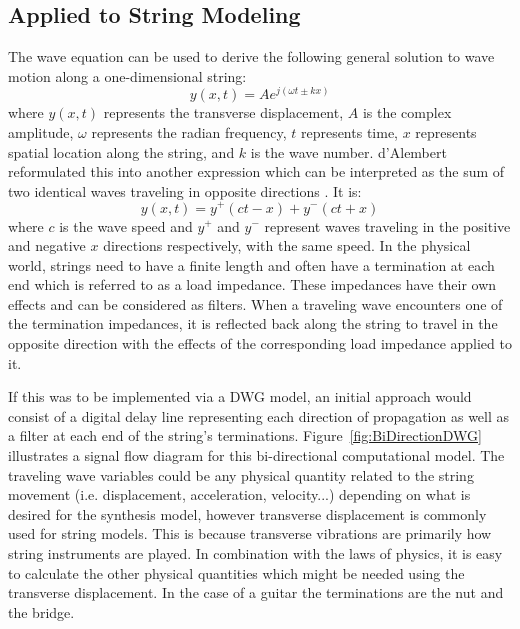 \documentclass[main.tex]{subfiles}
\begin{document}
\subsection{Applied to String Modeling}
The wave equation can be used to derive the following general solution to wave motion along a one-dimensional string:
\begin{equation}
    y(x,t) = Ae^{j\left(\omega t \pm k x\right)}
\end{equation}
where $y(x,t)$ represents the transverse displacement, $A$ is the complex amplitude, $\omega$ represents the radian frequency, $t$ represents time, $x$ represents spatial location along the string, and $k$ is the wave number. d'Alembert reformulated this into another expression which can be interpreted as the sum of two identical waves traveling in opposite directions . It is:
\begin{equation}
    y(x,t) = y^{+}(ct - x) + y^{-}(ct + x)
\end{equation}
where $c$ is the wave speed and $y^+$ and $y^-$ represent waves traveling in the positive and negative $x$ directions respectively, with the same speed. In the physical world, strings need to have a finite length and often have a termination at each end which is referred to as a load impedance. These impedances have their own effects and can be considered as filters. When a traveling wave encounters one of the termination impedances, it is reflected back along the string to travel in the opposite direction with the effects of the corresponding load impedance applied to it. 

If this was to be implemented via a DWG model, an initial approach would consist of a digital delay line representing each direction of propagation as well as a filter at each end of the string's terminations. Figure~\ref{fig:BiDirectionDWG} illustrates a signal flow diagram for this bi-directional computational model. The traveling wave variables could be any physical quantity related to the string movement (i.e. displacement, acceleration, velocity...) depending on what is desired for the synthesis model, however transverse displacement is commonly used for string models. This is because transverse vibrations are primarily how string instruments are played. In combination with the laws of physics, it is easy to calculate the other physical quantities which might be needed using the transverse displacement. In the case of a guitar the terminations are the nut and the bridge.
\end{document}
